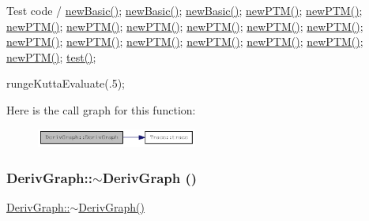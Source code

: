Test code / \hyperlink{classDerivGraph_a8862d4f9ebbd3eced9d56a81fe91c4fb}{newBasic()}; \hyperlink{classDerivGraph_a8862d4f9ebbd3eced9d56a81fe91c4fb}{newBasic()}; \hyperlink{classDerivGraph_a8862d4f9ebbd3eced9d56a81fe91c4fb}{newBasic()}; \hyperlink{classDerivGraph_a83937a5c3ed427ebaad2bf23260c0352}{newPTM()}; \hyperlink{classDerivGraph_a83937a5c3ed427ebaad2bf23260c0352}{newPTM()}; \hyperlink{classDerivGraph_a83937a5c3ed427ebaad2bf23260c0352}{newPTM()}; \hyperlink{classDerivGraph_a83937a5c3ed427ebaad2bf23260c0352}{newPTM()}; \hyperlink{classDerivGraph_a83937a5c3ed427ebaad2bf23260c0352}{newPTM()}; \hyperlink{classDerivGraph_a83937a5c3ed427ebaad2bf23260c0352}{newPTM()}; \hyperlink{classDerivGraph_a83937a5c3ed427ebaad2bf23260c0352}{newPTM()}; \hyperlink{classDerivGraph_a83937a5c3ed427ebaad2bf23260c0352}{newPTM()}; \hyperlink{classDerivGraph_a83937a5c3ed427ebaad2bf23260c0352}{newPTM()}; \hyperlink{classDerivGraph_a83937a5c3ed427ebaad2bf23260c0352}{newPTM()}; \hyperlink{classDerivGraph_a83937a5c3ed427ebaad2bf23260c0352}{newPTM()}; \hyperlink{classDerivGraph_a83937a5c3ed427ebaad2bf23260c0352}{newPTM()}; \hyperlink{classDerivGraph_a83937a5c3ed427ebaad2bf23260c0352}{newPTM()}; \hyperlink{classDerivGraph_a83937a5c3ed427ebaad2bf23260c0352}{newPTM()}; \hyperlink{classDerivGraph_a83937a5c3ed427ebaad2bf23260c0352}{newPTM()}; \hyperlink{classDerivGraph_abf589f6aabe2c66bbe6f1aeb68ff4593}{test()};

rungeKuttaEvaluate(.5);

Here is the call graph for this function:\nopagebreak
\begin{figure}[H]
\begin{center}
\leavevmode
\includegraphics[width=149pt]{classDerivGraph_af2a1f80b96b4657e7575748942d09947_cgraph}
\end{center}
\end{figure}
\hypertarget{classDerivGraph_a27b4fed56f8d2a745582622b7cb78b50}{
\subsubsection[{$\sim$DerivGraph}]{\setlength{\rightskip}{0pt plus 5cm}DerivGraph::$\sim$DerivGraph ()}}
\label{classDerivGraph_a27b4fed56f8d2a745582622b7cb78b50}
\hyperlink{classDerivGraph_a27b4fed56f8d2a745582622b7cb78b50}{DerivGraph::$\sim$DerivGraph()}

